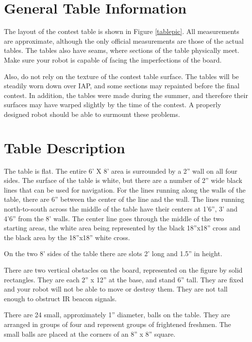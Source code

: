 
\section{General Table Information}

The layout of the contest table is shown in Figure
\ref{tablepic}. All measurements are approximate, although the only official
measurements are those of the actual tables.  The tables also have
seams, where sections of the table physically meet.  Make sure your
robot is capable of facing the imperfections of the board.

Also, do not rely on the texture of the contest table surface. The
tables will be steadily worn down over IAP, and some sections may
repainted before the final contest.  In addition, the tables were made
during the summer, and therefore their surfaces may have warped
slightly by the time of the contest.  A properly designed robot should
be able to surmount these problems.
 
\section{Table Description}

The table is flat. The entire 6' X 8' area is surrounded by a 2'' wall
on all four sides.  The surface of the table is white, but there are a
number of 2'' wide black lines that can be used for navigation.  For
the lines running along the walls of the table, there are 6'' between
the center of the line and the wall.  The lines running north-to-south
across the middle of the table have their centers at 1'6'', 3' and 4'6'' from the 8' walls.
The center line goes through the middle of the two starting areas, the white area being represented by the black 18''x18'' cross and the black area by the 18''x18'' white cross.

On the two 8' sides of the table there are slots 2' long and 1.5'' in height.

There are two vertical obstacles on the board, represented on the
figure by solid rectangles.  They are each 2'' x 12'' at the base, and
stand 6'' tall.  They are fixed and your robot will not be able to
move or destroy them.  They are not tall enough to obstruct IR beacon
signals.

There are 24 small, approximately 1'' diameter, balls on the table.
They are arranged in groups of four and represent groups of frightened
freshmen. The small balls are placed at the corners of an 8'' x 8'' square.

